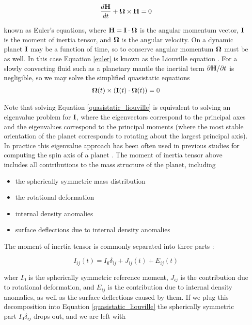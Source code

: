 \documentclass[extra,mreferee]{gji}
\begin{document}
\begin{equation}
\frac{d {\bf H}}{dt} + {\bf \Omega} \times {\bf H} = 0
\label{euler}
\end{equation}

known as Euler's equations, where ${\bf H} = {\bf I} \cdot {\bf \Omega}$ is the angular momentum vector, $\bf I$ is the moment of inertia tensor, and $\bf \Omega$ is the angular velocity.
On a dynamic planet $\bf I$ may be a function of time, so to conserve angular momentum $\bf \Omega$ must be as well.
In this case Equation \ref{euler} is known as the Liouville equation \citep[e.g.][]{munk1960rotation}.
For a slowly convecting fluid such as a planetary mantle the inertial term $\partial {\bf H} / \partial t$ is negligible, so we may solve the simplified quasistatic equations
\begin{equation}
{\bf \Omega } (t)\times ( {\bf I}(t) \cdot {\bf \Omega }(t) ) = 0
\label{quasistatic_liouville}
\end{equation}

Note that solving Equation \ref{quasistatic_liouville} is equivalent to solving an eigenvalue problem for ${\bf I}$, where the eigenvectors correspond to the principal axes and the eigenvalues correspond to the principal moments (where the most stable orientation of the planet corresponds to rotating about the largest principal axis).
In practice this eigenvalue approach has been often used in previous studies for computing the spin axis of a planet \citep[e.g.][]{steinberger1997changes, roberts2007cause}.
The moment of inertia tensor above includes all contributions to the mass structure of the planet, including
\begin{itemize}
\item the spherically symmetric mass distribution
\item the rotational deformation
\item internal density anomalies
\item surface deflections due to internal density anomalies
\end{itemize}

The moment of inertia tensor is commonly separated into three parts \citep{ricard1993polar}:

\begin{equation}
I_{ij}(t) = I_0 \delta_{ij} + J_{ij}(t) + E_{ij}(t)
\label{separation}
\end{equation}

wher $I_0$ is the spherically symmetric reference moment, $J_{ij}$ is the contribution due to rotational deformation, and $E_{ij}$ is the contribution due to internal density anomalies, as well as the surface deflections caused by them.
If we plug this decomposition into Equation \ref{quasistatic_liouville} the spherically symmetric part $I_0 \delta_{ij}$ drops out, and we are left with
\end{document}

